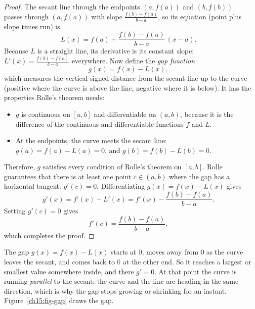 \begin{proof}
The secant line through the endpoints $(a,f(a))$ and $(b,f(b))$ passes through
$(a,f(a))$ with slope $\frac{f(b)-f(a)}{b-a}$, so its equation (point plus slope
times run) is
\[
  L(x)=f(a)+\frac{f(b)-f(a)}{b-a}\,(x-a).
\]
Because $L$ is a straight line, its derivative is its constant slope:
$L'(x)=\frac{f(b)-f(a)}{b-a}$ everywhere. Now define the \emph{gap function}
\[
  g(x)=f(x)-L(x),
\]
which measures the vertical signed distance from the secant line up to the curve
(positive where the curve is above the line, negative where it is below).
It has the properties Rolle's theorem needs:
\begin{itemize}
\item $g$ is continuous on $[a,b]$ and differentiable on $(a,b)$, because it is the
difference of the continuous and differentiable functions $f$ and $L$.
\item At the endpoints, the curve meets the secant line:
$g(a)=f(a)-L(a)=0$, and $g(b)=f(b)-L(b)=0$.
\end{itemize}
Therefore, $g$ satisfies every condition of Rolle's theorem on $[a,b]$. Rolle
guarantees that there is at least one point $c\in(a,b)$ where the gap has a
horizontal tangent: $g'(c)=0$. Differentiating $g(x)=f(x)-L(x)$ gives
\[
  g'(x)=f'(x)-L'(x)=f'(x)-\frac{f(b)-f(a)}{b-a}.
\]
Setting $g'(c)=0$ gives
\[
  f'(c)=\frac{f(b)-f(a)}{b-a},
\]
which completes the proof.
\end{proof}

\begin{happeningbox}
The gap $g(x)=f(x)-L(x)$ starts at $0$, moves away from $0$ as the curve leaves the
secant, and comes back to $0$ at the other end. So it reaches a largest or smallest
value somewhere inside, and there $g'=0$. At that point the curve is running
\emph{parallel} to the secant: the curve and the line are heading in the same
direction, which is why the gap stops growing or shrinking for an instant.
Figure~\ref{ch15:fig-gap} draws the gap.
\end{happeningbox}

